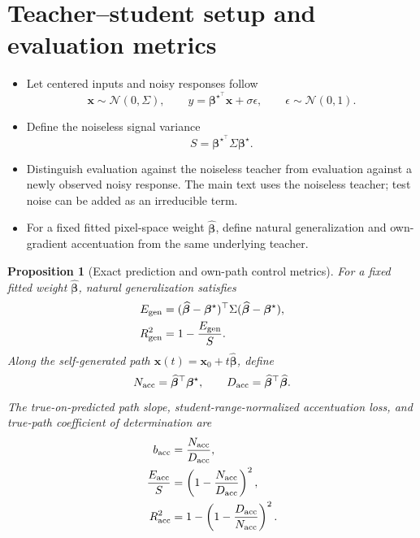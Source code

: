 \documentclass[11pt]{article}
\newtheorem{proposition}[theorem]{Proposition}
\newcommand{\bhat}{\widehat{\bm\beta}}
\newcommand{\bstar}{\bm\beta^{\star}}
\begin{document}
\section{Teacher--student setup and evaluation metrics}
\label{sec:setup}

\begin{itemize}
  \item Let centered inputs and noisy responses follow
  \begin{equation}
    \bm x\sim\mathcal N(0,\Sigma),\qquad
    y=\bstar^{\top}\bm x+\sigma\epsilon,
    \qquad \epsilon\sim\mathcal N(0,1).
    \label{eq:teacher}
  \end{equation}
  \item Define the noiseless signal variance
  \begin{equation}
    S=\bstar^{\top}\Sigma\bstar.
  \end{equation}
  \item Distinguish evaluation against the noiseless teacher from evaluation
        against a newly observed noisy response. The main text uses the
        noiseless teacher; test noise can be added as an irreducible term.
  \item For a fixed fitted pixel-space weight $\bhat$, define natural
        generalization and own-gradient accentuation from the same underlying
        teacher.
\end{itemize}

\begin{proposition}[Exact prediction and own-path control metrics]
\label{prop:exact-metrics}
For a fixed fitted weight $\bhat$, natural generalization satisfies
\begin{align}
  E_{\rm gen}
    &=(\bhat-\bstar)^{\top}\Sigma(\bhat-\bstar),\label{eq:egen-exact}\\
  R_{\rm gen}^{2}
    &=1-\frac{E_{\rm gen}}{S}.\label{eq:rgen-exact}
\end{align}
Along the self-generated path $\bm x(t)=\bm x_0+t\bhat$, define
\begin{equation}
  N_{\rm acc}=\bhat^{\top}\bstar,
  \qquad
  D_{\rm acc}=\bhat^{\top}\bhat.
\end{equation}
The true-on-predicted path slope, student-range-normalized accentuation loss,
and true-path coefficient of determination are
\begin{align}
  b_{\rm acc}
    &=\frac{N_{\rm acc}}{D_{\rm acc}},\label{eq:bacc-exact}\\
  \frac{E_{\rm acc}}{S}
    &=\left(1-\frac{N_{\rm acc}}{D_{\rm acc}}\right)^2,\label{eq:eacc-exact}\\
  R_{\rm acc}^{2}
    &=1-\left(1-\frac{D_{\rm acc}}{N_{\rm acc}}\right)^2.\label{eq:racc-exact}
\end{align}
\end{proposition}
\end{document}
